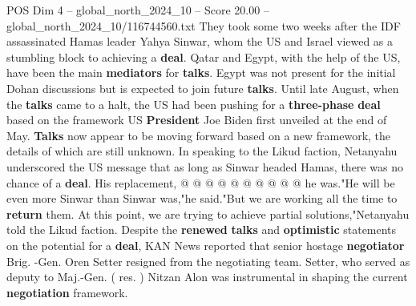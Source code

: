 \begin{textsample}{POS Dim 4 – global\_north\_2024\_10 – Score 20.00 – global\_north\_2024\_10/116744560.txt}
They took some two weeks after the IDF assassinated Hamas leader Yahya Sinwar, whom the US and Israel viewed as a stumbling block to achieving a \textbf{deal}.
Qatar and Egypt, with the help of the US, have been the main \textbf{mediators} for \textbf{talks}.
Egypt was not present for the initial Dohan discussions but is expected to join future \textbf{talks}.
Until late August, when the \textbf{talks} came to a halt, the US had been pushing for a \textbf{three-phase} \textbf{deal} based on the framework US \textbf{President} Joe Biden first unveiled at the end of May. \textbf{Talks} now appear to be moving forward based on a new framework, the details of which are still unknown.
In speaking to the Likud faction, Netanyahu underscored the US message that as long as Sinwar headed Hamas, there was no chance of a \textbf{deal}.
His replacement, @ @ @ @ @ @ @ @ @ @ he was."He will be even more Sinwar than Sinwar was,"he said."But we are working all the time to \textbf{return} them.
At this point, we are trying to achieve partial solutions,"Netanyahu told the Likud faction.
Despite the \textbf{renewed} \textbf{talks} and \textbf{optimistic} statements on the potential for a \textbf{deal}, KAN News reported that senior hostage \textbf{negotiator} Brig. -Gen.
Oren Setter resigned from the negotiating team.
Setter, who served as deputy to Maj.-Gen. ( res. ) Nitzan Alon was instrumental in shaping the current \textbf{negotiation} framework.

\end{textsample}
